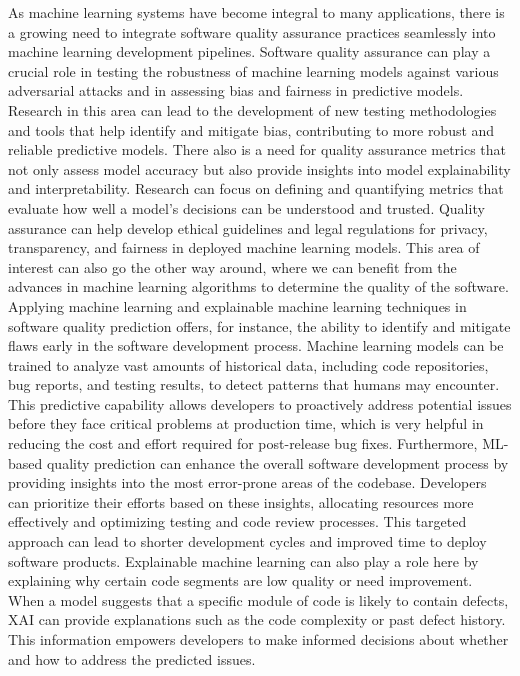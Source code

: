 \documentclass{article}
\begin{document}
As machine learning systems have become integral to many applications, there is a growing need to integrate software quality assurance practices seamlessly into machine learning development pipelines. Software quality assurance can play a crucial role in testing the robustness of machine learning models against various adversarial attacks and in assessing bias and fairness in predictive models. Research in this area can lead to the development of new testing methodologies and tools that help identify and mitigate bias, contributing to more robust and reliable predictive models.
There also is a need for quality assurance metrics that not only assess model accuracy but also provide insights into model explainability and interpretability. Research can focus on defining and quantifying metrics that evaluate how well a model's decisions can be understood and trusted. Quality assurance can help develop ethical guidelines and legal regulations for privacy, transparency, and fairness in deployed machine learning models.
This area of interest can also go the other way around, where we can benefit from the advances in machine learning algorithms to determine the quality of the software. Applying machine learning and explainable machine learning techniques in software quality prediction offers, for instance, the ability to identify and mitigate flaws early in the software development process. Machine learning models can be trained to analyze vast amounts of historical data, including code repositories, bug reports, and testing results, to detect patterns that humans may encounter. This predictive capability allows developers to proactively address potential issues before they face critical problems at production time, which is very helpful in reducing the cost and effort required for post-release bug fixes.
Furthermore, ML-based quality prediction can enhance the overall software development process by providing insights into the most error-prone areas of the codebase. Developers can prioritize their efforts based on these insights, allocating resources more effectively and optimizing testing and code review processes. This targeted approach can lead to shorter development cycles and improved time to deploy software products. Explainable machine learning can also play a role here by explaining why certain code segments are low quality or need improvement. When a model suggests that a specific module of code is likely to contain defects, XAI can provide explanations such as the code complexity or past defect history. This information empowers developers to make informed decisions about whether and how to address the predicted issues.
\end{document}
